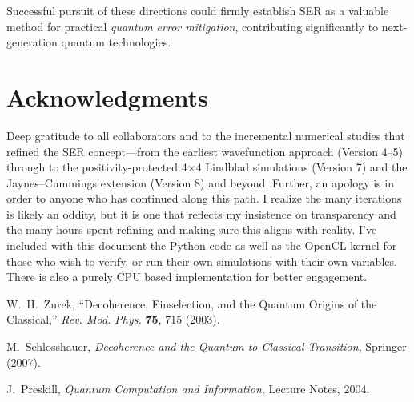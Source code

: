 \documentclass{article}
\begin{document}
Successful pursuit of these directions could firmly establish SER as a valuable method for practical \emph{quantum error mitigation}, contributing significantly to next-generation quantum technologies.

\section*{Acknowledgments}
Deep gratitude to all collaborators and to the incremental numerical studies that refined the SER concept---from the earliest wavefunction approach (Version 4--5) through to the positivity-protected 4$\times$4 Lindblad simulations (Version 7) and the Jaynes--Cummings extension (Version 8) and beyond. Further, an apology is in order to anyone who has continued along this path. I realize the many iterations is likely an oddity, but it is one that reflects my insistence on transparency and the many hours spent refining and making sure this aligns with reality. I've included with this document the Python code as well as the OpenCL kernel for those who wish to verify, or run their own simulations with their own variables. There is also a purely CPU based implementation for better engagement.

\begin{thebibliography}{9}

W.~H.~Zurek, 
``Decoherence, Einselection, and the Quantum Origins of the Classical,''
\emph{Rev. Mod. Phys.} \textbf{75}, 715 (2003).

M.~Schlosshauer,
\emph{Decoherence and the Quantum-to-Classical Transition},
Springer (2007).

J.~Preskill,
\emph{Quantum Computation and Information},
Lecture Notes, 2004.

\end{thebibliography}
\end{document}
